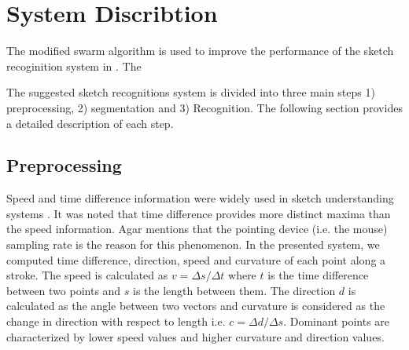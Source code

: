 \documentclass[10pt]{article}
\begin{document}



\section{System Discribtion  }\label{Sysdisc}
The modified swarm algorithm is used to improve the performance of the sketch recoginition system in \cite{myPaper}. The 

 The suggested sketch recognitions system is divided into three main steps 1) preprocessing, 2) segmentation and 3) Recognition. The following section provides a detailed description of each step.
\subsection{Preprocessing}
\label{Prepross}
 Speed and time difference information were widely used in sketch understanding systems \cite{earlyprocess}. It was noted that time difference provides more distinct maxima than the speed information. Agar \cite{polygonfeedback31} mentions that the pointing device (i.e. the mouse) sampling rate is the reason for this phenomenon. 
 In the presented system, we computed time difference, direction, speed and curvature of each point along a stroke. The speed is calculated as $v=\Delta s/\Delta t$ where $t$ is the time difference between two points and $s$ is the length between them. The direction $d$ is calculated as the angle between two vectors and curvature is considered as the change in direction with respect to length i.e. $c= \Delta d/\Delta s$. Dominant points are characterized by lower speed values and higher curvature and direction values.
  
\end{document}
